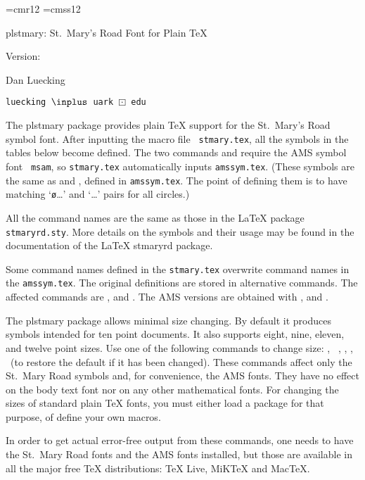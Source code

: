 
\def\br{\hfil\break}
\def\cmd#1{{\tt\string#1}}
\font\headfont=cmr12
\font\headsf=cmss12
\hsize 6.5in \vsize 8.9in \hoffset 0pt \voffset 0pt

\centerline{\headsf
    plstmary: \headfont St.\ Mary's Road Font for Plain \TeX}
\centerline{Version: \plstmaryversion}
\medskip
\centerline{Dan Luecking}
\centerline{\tt luecking $\inplus$ uark $\boxdot$ edu}
\bigskip

\noindent The plstmary package provides plain TeX support for the St.\
Mary's Road symbol font. After inputting the macro file {\tt
stmary.tex}, all the symbols in the tables below become defined. The two
commands {\cmd\oast} and {\cmd\ocircle} require the AMS symbol font {\tt
msam}, so {\tt stmary.tex} automatically inputs {\tt amssym.tex}. (These
symbols are the same as {\cmd\circledast} and {\cmd\circledcirc},
defined in {\tt amssym.tex}. The point of defining them is to have
matching `{\cmd\o}\dots' and `{\cmd\varo}\dots' pairs for all circles.)

All the command names are the same as those in the LaTeX package {\tt
stmaryrd.sty}. More details on the symbols and their usage may be found
in the documentation of the LaTeX stmaryrd package.

Some command names defined in the {\tt stmary.tex} overwrite command
names in the {\tt amssym.tex}. The original definitions are stored in
alternative commands. The affected commands are {\cmd\bigtriangledown},
{\cmd\bigtriangleup} and {\cmd\boxdot}. The AMS versions are obtained
with {\tt \string\amsbigtriangledown}, {\cmd\amsbigtriangleup} and
{\cmd\amsboxdot}.

The plstmary package allows minimal size changing. By default it
produces symbols intended for ten point documents. It also supports
eight, nine, eleven, and twelve point sizes. Use one of the following
commands to change size:\hfil\break
\indent{\cmd\stmaryrdeightpoint},\quad
{\tt\ \string\stmaryrdninepoint},\br
\indent{\cmd\stmaryrdelevenpoint},\quad
{\cmd\stmaryrdtwelvepoint},\br
\indent{\cmd\stmaryrdtenpoint} \ (to restore the default if it has been
changed).\br
These commands affect only the St.\ Mary Road symbols and, for
convenience, the AMS fonts. They have no effect on the body text font
nor on any other mathematical fonts. For changing the sizes of standard
plain TeX fonts, you must either load a package for that purpose, of
define your own macros.

In order to get actual error-free output from these commands, one needs
to have the St.\ Mary Road fonts and the AMS fonts installed, but those
are available in all the major free TeX distributions: TeX Live, MiKTeX
and MacTeX.

